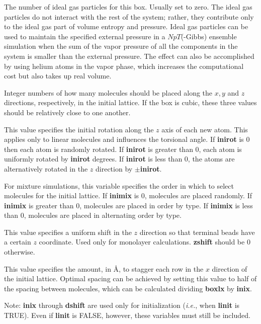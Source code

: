 \documentclass[12pt,letterpaper]{article}
\begin{document}
 The number of ideal gas
particles for this box. Usually set to zero. The ideal gas
particles do not interact with the rest of the system;
rather, they contribute only to the ideal gas part of volume
entropy and pressure. Ideal gas particles can be used to
maintain the specified external pressure in a $NpT$(-Gibbs)
ensemble simulation when the sum of the vapor pressure of
all the components in the system is smaller than the
external pressure. The effect can also be accomplished by
using helium atoms in the vapor phase, which increases the
computational cost but also takes up real volume.

 Integer numbers of how many
molecules should be placed along the $x, y$ and $z$
directions, respectively, in the initial lattice. If the box
is cubic, these three values should be relatively close to
one another.

 This value specifies the initial
rotation along the $z$ axis of each new atom. This applies
only to linear molecules and influences the torsional angle.
If {\bf inirot} is 0 then each atom is randomly rotated. If
{\bf inirot} is greater than 0, each atom is uniformly
rotated by {\bf inirot} degrees. If {\bf inirot} is less
than 0, the atoms are alternatively rotated in the $z$
direction by $\pm$\textbf{inirot}.

 For mixture simulations, this
variable specifies the order in which to select molecules
for the initial lattice. If {\bf inimix} is 0, molecules are
placed randomly. If {\bf inimix} is greater than 0,
molecules are placed in order by type. If {\bf inimix} is
less than 0, molecules are placed in alternating order by
type.

 This value specifies a uniform shift
in the $z$ direction so that terminal beads have a certain
$z$ coordinate. Used only for monolayer calculations. {\bf
  zshift} should be 0 otherwise.

 This value specifies the amount, in
\AA, to stagger each row in the $x$ direction of the initial
lattice. Optimal spacing can be achieved by setting this
value to half of the spacing between molecules, which can be
calculated dividing {\bf boxlx} by {\bf inix}.

Note: \textbf{inix} through \textbf{dshift} are used only
for initialization (\textit{i.e.}, when {\bf linit} is
TRUE). Even if {\bf linit} is FALSE, however, these
variables must still be included.
\end{document}
